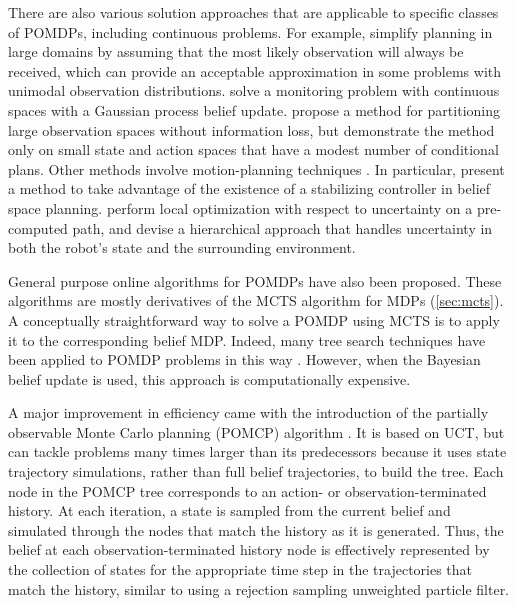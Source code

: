 There are also various solution approaches that are applicable to specific classes of POMDPs, including continuous problems.
For example, \citet{platt2010belief} simplify planning in large domains by assuming that the most likely observation will always be received, which can provide an acceptable approximation in some problems with unimodal observation distributions.
\citet{morere2016bayesian} solve a monitoring problem with continuous spaces with a Gaussian process belief update.
\citet{hoey2005solving} propose a method for partitioning large observation spaces without information loss, but demonstrate the method only on small state and action spaces that have a modest number of conditional plans.
Other methods involve motion-planning techniques \cite{melchior2007particle,prentice2009belief,bry2011rapidly}.
In particular, \citet{agha2011firm} present a method to take advantage of the existence of a stabilizing controller in belief space planning.
\citet{van2012motion} perform local optimization with respect to uncertainty on a pre-computed path, and \citet{indelman2015planning} devise a hierarchical approach that handles uncertainty in both the robot's state and the surrounding environment.

General purpose online algorithms for POMDPs have also been proposed.
These algorithms are mostly derivatives of the MCTS algorithm for MDPs (\cref{sec:mcts}).
A conceptually straightforward way to solve a POMDP using MCTS is to apply it to the corresponding belief MDP.
Indeed, many tree search techniques have been applied to POMDP problems in this way \cite{ross2008online}.
However, when the Bayesian belief update is used, this approach is computationally expensive.

A major improvement in efficiency came with the introduction of the partially observable Monte Carlo planning (POMCP) algorithm \cite{silver2016mastering}. It is based on UCT, but can tackle problems many times larger than its predecessors because it uses state trajectory simulations, rather than full belief trajectories, to build the tree.
Each node in the POMCP tree corresponds to an action- or observation-terminated history.
At each iteration, a state is sampled from the current belief and simulated through the nodes that match the history as it is generated.
Thus, the belief at each observation-terminated history node is effectively represented by the collection of states for the appropriate time step in the trajectories that match the history, similar to using a rejection sampling unweighted particle filter.

